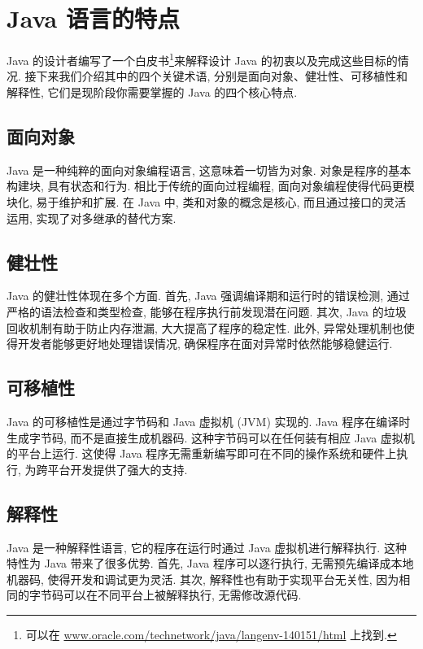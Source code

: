\documentclass[10pt,UTF8]{book} %
\begin{document}
\section{Java 语言的特点}

Java 的设计者编写了一个白皮书\footnote{可以在 
\url{www.oracle.com/technetwork/java/langenv-140151/html} 上找到.}来解释设计 
Java 的初衷以及完成这些目标的情况. 接下来我们介绍其中的四个关键术语, 
分别是面向对象、健壮性、可移植性和解释性, 它们是现阶段你需要掌握的 Java 的四个核心特点.

\subsection{面向对象}

Java 是一种纯粹的面向对象编程语言, 这意味着一切皆为对象. 对象是程序的基本构建块, 具有状态和行为. 
相比于传统的面向过程编程, 面向对象编程使得代码更模块化, 易于维护和扩展. 在 Java 中, 
类和对象的概念是核心, 而且通过接口的灵活运用, 实现了对多继承的替代方案. 

\subsection{健壮性}

Java 的健壮性体现在多个方面. 首先, Java 强调编译期和运行时的错误检测, 
通过严格的语法检查和类型检查, 能够在程序执行前发现潜在问题. 其次, 
Java 的垃圾回收机制有助于防止内存泄漏, 大大提高了程序的稳定性. 此外, 
异常处理机制也使得开发者能够更好地处理错误情况, 确保程序在面对异常时依然能够稳健运行. 

\subsection{可移植性}

Java 的可移植性是通过字节码和 Java 虚拟机 (JVM) 实现的. Java 程序在编译时生成字节码, 
而不是直接生成机器码. 这种字节码可以在任何装有相应 Java 虚拟机的平台上运行. 
这使得 Java 程序无需重新编写即可在不同的操作系统和硬件上执行, 为跨平台开发提供了强大的支持. 

\subsection{解释性}

Java 是一种解释性语言, 它的程序在运行时通过 Java 虚拟机进行解释执行. 
这种特性为 Java 带来了很多优势. 首先, Java 程序可以逐行执行, 
无需预先编译成本地机器码, 使得开发和调试更为灵活. 
其次, 解释性也有助于实现平台无关性, 因为相同的字节码可以在不同平台上被解释执行, 无需修改源代码. 
\end{document}
